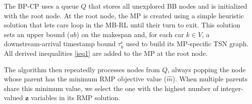 \documentclass[12pt]{article}
\begin{document}
The BP-CP uses a queue $Q$ that stores all unexplored BB nodes and is initialized with the root node. At the root node, the MP is created using a simple heuristic solution that lets cars loop in the MB-RL until their turn to exit. This solution sets an upper bound ($ub$) on the makespan and, for each car $k\in V$, a downstream-arrival timestamp bound $\tau^e_k$ used to build its MP-specific TSN graph. All derived inequalities \eqref{ieq1} are added to the MP at the root node.





The algorithm then repeatedly processes nodes from $Q$, always popping the node whose parent has the minimum RMP objective value ($\widehat{m}$). When multiple parents share this minimum value, we select the one with the highest number of integer-valued $\boldsymbol{z}$ variables in its RMP solution.


\end{document}
